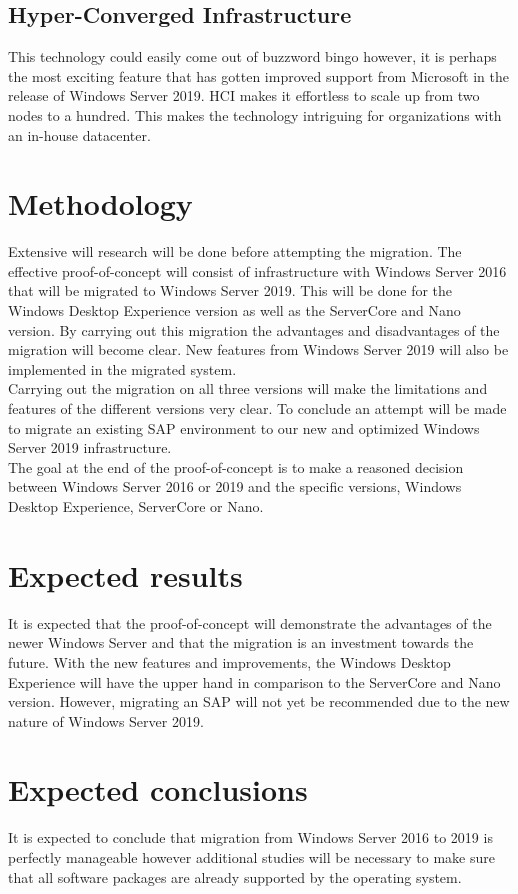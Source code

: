\subsection{Hyper-Converged Infrastructure}
This technology could easily come out of buzzword bingo however, it is perhaps the most exciting feature that has gotten improved support from Microsoft in the release of Windows Server 2019. HCI makes it effortless to scale up from two nodes to a hundred. This makes the technology intriguing for organizations with an in-house datacenter.
\section{Methodology}\label{sec:methodology}
Extensive will research will be done before attempting the migration. The effective proof-of-concept will consist of infrastructure with Windows Server 2016 that will be migrated to Windows Server 2019. This will be done for the Windows Desktop Experience version as well as the ServerCore and Nano version. By carrying out this migration the advantages and disadvantages of the migration will become clear. New features from Windows Server 2019 will also be implemented in the migrated system. 
\\
Carrying out the migration on all three versions will make the limitations and features of the different versions very clear. 
To conclude an attempt will be made to migrate an existing SAP environment to our new and optimized Windows Server 2019 infrastructure.
\\
The goal at the end of the proof-of-concept is to make a reasoned decision between Windows Server 2016 or 2019 and the specific versions, Windows Desktop Experience, ServerCore or Nano.
\section{Expected results}\label{sec:anticipated_results}
It is expected that the proof-of-concept will demonstrate the advantages of the newer Windows Server and that the migration is an investment towards the future. With the new features and improvements, the Windows Desktop Experience will have the upper hand in comparison to the ServerCore and Nano version. However, migrating an SAP will not yet be recommended due to the new nature of Windows Server 2019. 
\section{Expected conclusions}\label{sec:anticipated_conclusions}
It is expected to conclude that migration from Windows Server 2016 to 2019 is perfectly manageable however additional studies will be necessary to make sure that all software packages are already supported by the operating system.